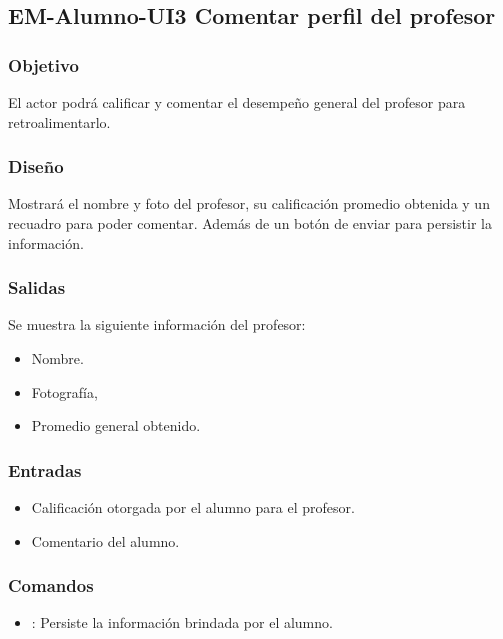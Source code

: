 \pagebreak
\subsection{EM-Alumno-UI3 Comentar perfil del profesor}

\subsubsection{Objetivo}
	El actor podrá calificar y comentar el desempeño general del profesor para retroalimentarlo.

\subsubsection{Diseño}
	Mostrará el nombre y foto del profesor, su calificación promedio obtenida y un recuadro para poder comentar. Además de un botón de enviar para persistir la información.


\subsubsection{Salidas}
	Se muestra la siguiente información del profesor:
	\begin{itemize} 
		\item Nombre.
		\item Fotografía,
		\item Promedio general obtenido.
	\end{itemize}

\subsubsection{Entradas}

\begin{itemize}
	\item Calificación otorgada por el alumno para el profesor.
	\item Comentario del alumno.
\end{itemize}

\subsubsection{Comandos}
\begin{itemize}
	\item {}: Persiste la información brindada por el alumno.
\end{itemize}

